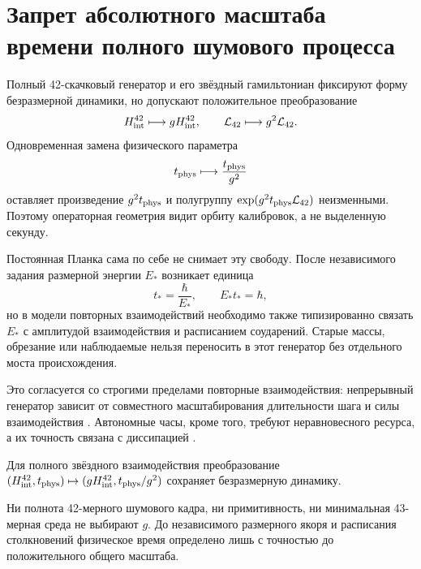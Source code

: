 \chapter{Запрет абсолютного масштаба времени полного шумового процесса}
\label{ch:v8-full-noise-physical-time-scale-no-go-gate}

Полный 42-скачковый генератор и его звёздный гамильтониан фиксируют форму
безразмерной динамики, но допускают положительное преобразование
\begin{equation}
 H_{\rm int}^{42}\longmapsto gH_{\rm int}^{42},
 \qquad
 \mathcal L_{42}\longmapsto g^2\mathcal L_{42}.
\end{equation}
Одновременная замена физического параметра
\begin{equation}
 t_{\rm phys}\longmapsto \frac{t_{\rm phys}}{g^2}
\end{equation}
оставляет произведение $g^2t_{\rm phys}$ и полугруппу
$\exp(g^2t_{\rm phys}\mathcal L_{42})$ неизменными. Поэтому операторная
геометрия видит орбиту калибровок, а не выделенную секунду.

Постоянная Планка сама по себе не снимает эту свободу. После независимого
задания размерной энергии $E_*$ возникает единица
\begin{equation}
 t_*=\frac{\hbar}{E_*},
 \qquad E_*t_*=\hbar,
\end{equation}
но в модели повторных взаимодействий необходимо также типизированно связать
$E_*$ с амплитудой взаимодействия и расписанием соударений. Старые массы,
обрезание или наблюдаемые нельзя переносить в этот генератор без отдельного
моста происхождения.

Это согласуется со строгими пределами повторные взаимодействия: непрерывный
генератор зависит от совместного масштабирования длительности шага и силы
взаимодействия \cite{AttalPautrat2006,AttalJoye2007}. Автономные часы,
кроме того, требуют неравновесного ресурса, а их точность связана с
диссипацией \cite{ErkerEtAl2017}.

\begin{theorem}
Для полного звёздного взаимодействия преобразование
$(H_{\rm int}^{42},t_{\rm phys})\mapsto
(gH_{\rm int}^{42},t_{\rm phys}/g^2)$ сохраняет безразмерную динамику.
\end{theorem}

\begin{nogocriterion}
Ни полнота 42-мерного шумового кадра, ни примитивность, ни минимальная
43-мерная среда не выбирают $g$. До независимого размерного якоря и
расписания столкновений физическое время определено лишь с точностью до
положительного общего масштаба.
\end{nogocriterion}

